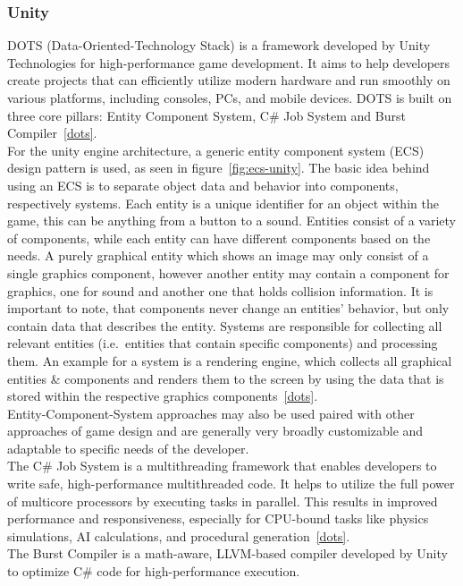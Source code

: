 \subsubsection{Unity}\label{subsubsec:entity-component-system}
DOTS (Data-Oriented-Technology Stack) is a framework developed by Unity Technologies for high-performance game development.
It aims to help developers create projects that can efficiently utilize modern hardware and run smoothly on various platforms,
including consoles, PCs, and mobile devices.
DOTS is built on three core pillars: Entity Component System, C\# Job System and Burst Compiler~\ref{dots}.
\\
For the unity engine architecture, a generic entity component system (ECS) design pattern is used, as seen in figure~\ref{fig:ecs-unity}.
The basic idea behind using an ECS is to separate object data and behavior into components, respectively systems.
Each entity is a unique identifier for an object within the game, this can be anything from a button to a sound.
Entities consist of a variety of components, while each entity can have different components based on the needs.
A purely graphical entity which shows an image may only consist of a single graphics component, however another entity may contain
a component for graphics, one for sound and another one that holds collision information.
It is important to note, that components never change an entities' behavior, but only contain data that describes the entity.
Systems are responsible for collecting all relevant entities (i.e.\ entities that contain specific components) and processing them.
An example for a system is a rendering engine, which collects all graphical entities \& components and renders them to the screen by
using the data that is stored within the respective graphics components~\ref{dots}.
\\
Entity-Component-System approaches may also be used paired with other approaches of game design and are generally very broadly customizable and adaptable
to specific needs of the developer.
\\
The C\# Job System is a multithreading framework that enables developers to write safe, high-performance multithreaded code.
It helps to utilize the full power of multicore processors by executing tasks in parallel.
This results in improved performance and responsiveness, especially for CPU-bound tasks like physics simulations, AI calculations, and procedural generation~\ref{dots}.
\\
The Burst Compiler is a math-aware, LLVM-based compiler developed by Unity to optimize C\# code for high-performance execution.
